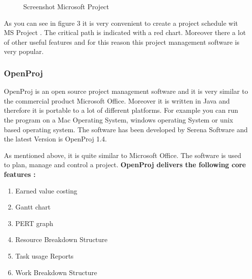 \begin{figure}[h!!] 
\centerline{}
\caption{Screenshot Microsoft Project \cite{msp}}
\label{pic:msproject}
\end{figure}

As you can see in figure 3 it is very convenient to create a project schedule wit MS Project . The critical path is indicated with a red chart. Moreover there a lot of other useful features and for this reason this project management software is very popular.

\subsubsection{OpenProj}
OpenProj \cite{opr} is an open source project management software and it is very similar to the commercial product Microsoft Office. Moreover it is written in Java and therefore it is portable to a lot of different platforms. For example you can run the program on a Mac Operating System, windows operating System or unix based operating system.
The software has been developed by Serena Software and the latest Version is OpenProj 1.4.

As mentioned above, it is quite similar to Microsoft Office. The software is used to plan, manage and control a project.
\newline
\newline
\noindent
\textbf{OpenProj delivers the following core features \cite{opr}:}
\begin{enumerate}
\item Earned value costing
\item Gantt chart
\item PERT graph
\item Resource Breakdown Structure
\item Task usage Reports
\item Work Breakdown Structure
\end{enumerate}

